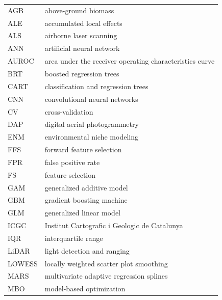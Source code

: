 \documentclass[remotesensing,article,accept,moreauthors,pdftex]{Definitions/mdpi}
\begin{document}
\begin{paracol}{2}
{	\noindent
	\begin{tabular}{@{}ll}
		AGB     & above-ground biomass                                    \\
		ALE     & accumulated local effects                               \\
		ALS     & airborne laser scanning                                 \\
		ANN     & artificial neural network                               \\
		AUROC   & area under the receiver operating characteristics curve \\
		BRT     & boosted regression trees                                \\
		CART    & classification and regression trees                     \\
		CNN     & convolutional neural networks                           \\
		CV      & cross-validation                                        \\
		DAP     & digital aerial photogrammetry                           \\
		ENM     & environmental niche modeling                            \\
		FFS     & forward feature selection                               \\
		FPR     & false positive rate                                     \\
		FS      & feature selection                                       \\
		GAM     & generalized additive model                              \\
		GBM     & gradient boosting machine                               \\
		GLM     & generalized linear model                                \\
		ICGC    & Institut Cartografic i Geologic de Catalunya            \\
		IQR     & interquartile range                                     \\
		LiDAR   & light detection and ranging                             \\
		LOWESS  & locally weighted scatter plot smoothing                 \\
		MARS    & multivariate adaptive regression splines                \\
		MBO     & model-based optimization                                \\

\end{tabular}}
\end{paracol}
\end{document}
